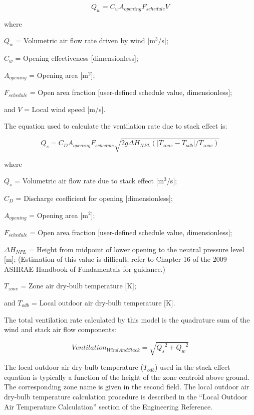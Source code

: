 \begin{equation}
{Q_w} = {C_w}{A_{opening}}{F_{schedule}}V
\end{equation}

where

$Q_{w}$ = Volumetric air flow rate driven by wind {[}m\(^{3}\)/s{]};

$C_{w}$ = Opening effectiveness {[}dimensionless{]};

$A_{opening}$ = Opening area {[}m\(^{2}\){]};

$F_{schedule}$ = Open area fraction {[}user-defined schedule value, dimensionless{]};

and $V$ = Local wind speed {[}m/s{]}.

The equation used to calculate the ventilation rate due to stack effect is:

\begin{equation}
{Q_s} = {C_D}{A_{opening}}{F_{schedule}}\sqrt {2g\Delta {H_{NPL}}(|{T_{zone}} - {T_{odb}}|/{T_{zone}})}
\end{equation}

where

$Q_{s}$ = Volumetric air flow rate due to stack effect {[}m\(^{3}\)/s{]};

$C_{D}$ = Discharge coefficient for opening {[}dimensionless{]};

$A_{opening}$ = Opening area {[}m\(^{2}\){]};

$F_{schedule}$ = Open area fraction {[}user-defined schedule value, dimensionless{]};

$\Delta{}H_{NPL}$ = Height from midpoint of lower opening to the neutral pressure level {[}m{]}; (Estimation of this value is difficult; refer to Chapter 16 of the 2009 ASHRAE Handbook of Fundamentals for guidance.)

$T_{zone}$ = Zone air dry-bulb temperature {[}K{]};

and $T_{odb}$ = Local outdoor air dry-bulb temperature {[}K{]}.

The total ventilation rate calculated by this model is the quadrature sum of the wind and stack air flow components:

\begin{equation}
Ventilatio{n_{WindAndStack}} = \sqrt {{Q_s}^2 + {Q_w}^2}
\end{equation}

The local outdoor air dry-bulb temperature ($T_{odb}$) used in the stack effect equation is typically a function of the height of the zone centroid above ground. The corresponding zone name is given in the second field. The local outdoor air dry-bulb temperature calculation procedure is described in the ``Local Outdoor Air Temperature Calculation'' section of the Engineering Reference.

